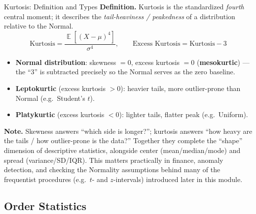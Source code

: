 \documentclass[11pt,aspectratio=169]{beamer}
\newcommand{\E}{\operatorname{\mathbb{E}}}
\newcommand{\Def}[1]{\textbf{Definition.} #1}
\newcommand{\Note}[1]{\textbf{Note.} #1}
\begin{document}
\begin{frame}{Kurtosis: Definition and Types}
\Def{Kurtosis is the standardized \emph{fourth} central moment; it
describes the \emph{tail-heaviness / peakedness} of a distribution
relative to the Normal.}
\[
    \text{Kurtosis} = \frac{\E[(X-\mu)^4]}{\sigma^4}, \qquad
    \text{Excess Kurtosis} = \text{Kurtosis} - 3
\]

\begin{itemize}
    \item \textbf{Normal distribution}: skewness $=0$, excess kurtosis
          $=0$ (\textbf{mesokurtic}) — the ``3'' is subtracted precisely so
          the Normal serves as the zero baseline.
    \item \textbf{Leptokurtic} (excess kurtosis $>0$): heavier tails, more
          outlier-prone than Normal (e.g.\ Student's $t$).
    \item \textbf{Platykurtic} (excess kurtosis $<0$): lighter tails,
          flatter peak (e.g.\ Uniform).
\end{itemize}

\Note{Skewness answers ``which side is longer?''; kurtosis answers ``how
heavy are the tails / how outlier-prone is the data?'' Together they
complete the ``shape'' dimension of descriptive statistics, alongside
center (mean/median/mode) and spread (variance/SD/IQR). This matters
practically in finance, anomaly detection, and checking the Normality
assumptions behind many of the frequentist procedures (e.g.\ $t$- and
$z$-intervals) introduced later in this module.}
\end{frame}

\subsection{Order Statistics}
\end{document}
